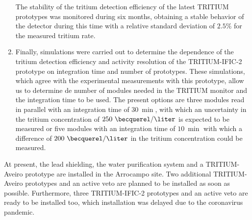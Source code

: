 \begin{enumerate}
The stability of the tritium detection efficiency of the latest TRITIUM prototypes was monitored during six months, obtaining a stable behavior of the detector during this time with a relative standard deviation of $2.5\%$ for the measured tritium rate. 

\item{} Finally, simulations were carried out to determine the dependence of the tritium detection efficiency and activity resolution of the TRITIUM-IFIC-2 prototype on integration time and number of prototypes. These simulations, which agree with the experimental measurements with this prototype, allow us to determine de number of modules needed in the TRITIUM monitor and the integration time to be used. The present options are three modules read in parallel with an integration time of $30~\min$, with which an uncertainty in the tritium concentration of $250~\becquerel/\liter$ is expected to be measured or five modules with an integration time of $10~\min$ with which a difference of $200~\becquerel/\liter$ in the tritium concentration could be measured.

\end{enumerate}

At present, the lead shielding, the water purification system and a TRITIUM-Aveiro prototype are installed in the Arrocampo site. Two additional TRITIUM-Aveiro prototypes and an active veto are planned to be installed as soon as possible. Furthermore, three TRITIUM-IFIC-2 prototypes and an active veto are ready to be installed too, which installation was delayed due to the coronavirus pandemic.